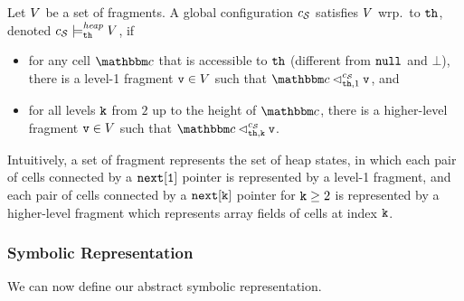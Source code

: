 Let $V$ be a set of fragments.
A global configuration $c_{\mathcal S}$ satisfies $V$
wrp.\ to ${\tt th}$, denoted  $c_{\mathcal S} \models_{{\tt th}}^{\mathit{heap}} V$, if
\begin{itemize}
  \item for any cell $\cell$ that is accessible to ${\tt th}$ (different from ${\tt null}$ and $\bot$), there is a level-1 fragment
$\mathtt{v} \in V$ such that $\cell \lsatfrag{1}{{\thread}}{\sconf} \frag$,
    and
  \item
    for all levels ${\tt k}$ from $2$ up to the height of $\cell$, 
there is a higher-level fragment
$\mathtt{v} \in V$ such that $\cell \lsatfrag{\klevel}{{\thread}}{\sconf} \frag$.
\end{itemize}
Intuitively, a set of fragment represents the set of heap states, in which
each  pair of cells connected by a $\tt next[1]$ pointer is represented
by a level-1 fragment, and each pair of cells connected by a $\tt next[k]$
pointer for ${\tt k} \geq 2$ is represented by a higher-level fragment which 
represents array fields of cells at index ${\tt k}$.

\subsubsection{Symbolic Representation}
We can now define our abstract symbolic representation.

